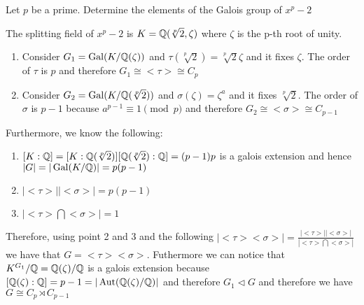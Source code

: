 \begin{exercise}
    Let $p$ be a prime. Determine the elements of the Galois group of $x^p - 2$
\end{exercise}
\begin{solution}
    The splitting field of $x^p - 2$ is $K = \mathbb{Q}(\sqrt[p]{2}, \zeta)$ where $\zeta$ is the p-th root of unity.
    \begin{enumerate}
        \item Consider $G_1 = \operatorname{Gal}(K/\mathbb{Q}(\zeta))$ and $\tau(\sqrt[p]{2})=\sqrt[p]{2}\zeta$ and it fixes $\zeta$. The order of $\tau$ is $p$ and therefore $G_1 \cong \big< \tau \big> \cong C_p$
        \item Consider $G_2 = \operatorname{Gal}(K/\mathbb{Q}(\sqrt[p]{2}))$ and $\sigma(\zeta)=\zeta^a$ and it fixes $\sqrt[p]{2}$. The order of $\sigma$ is $p-1$ because $a^{p-1} \equiv 1 \pmod{p}$ and therefore $G_2 \cong \big< \sigma \big> \cong C_{p-1}$
    \end{enumerate}
    Furthermore, we know the following:
    \begin{enumerate}
        \item $[K:\mathbb{Q}] = [K:\mathbb{Q}(\sqrt[p]{2})][\mathbb{Q}(\sqrt[p]{2}):\mathbb{Q}] = (p-1)p$ is a galois extension and hence $|G| = |\operatorname{Gal}(K/\mathbb{Q})| = p(p-1)$
        \item $|\big< \tau \big>||\big< \sigma \big>| = p(p-1)$
        \item $|\big< \tau \big> \bigcap \big< \sigma \big>| = 1$
    \end{enumerate}
    Therefore, using point 2 and 3 and the following $|\big< \tau \big>\big< \sigma \big>| = \frac{|\big< \tau \big>||\big< \sigma \big>|}{|\big< \tau \big> \bigcap \big< \sigma \big>|}$ we have that $G = \big< \tau \big>\big< \sigma \big>$. Futhermore we can notice that $K^{G_1}/\mathbb{Q} = \mathbb{Q}(\zeta)/\mathbb{Q}$ is a galois extension because $[\mathbb{Q}(\zeta):\mathbb{Q}] = p-1 = |\operatorname{Aut}(\mathbb{Q}(\zeta)/\mathbb{Q})|$ and therefore $G_1 \triangleleft G$ and therefore we have $G \cong C_p \rtimes C_{p-1}$
\end{solution}

